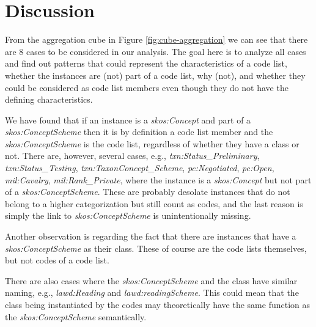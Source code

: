 
\section{Discussion}
\label{s:discussion}
From the aggregation cube in Figure \ref{fig:cube-aggregation} we can see that there are 8 cases to be considered in our analysis. The goal here is to analyze all cases and find out patterns that could represent the characteristics of a code list, whether the instances are (not) part of a code list, why (not), and whether they could be considered as code list members even though they do not have the defining characteristics.

We have found that if an instance is a \textit{skos:Concept} and part of a \textit{skos:ConceptScheme} then it is by definition a code list member and the \textit{skos:ConceptScheme} is the code list, regardless of whether they have a class or not. There are, however, several cases, e.g., \textit{txn:Status\_Preliminary}, \textit{txn:Status\_Testing}, \textit{txn:TaxonConcept\_Scheme}, \textit{pc:Negotiated}, \textit{pc:Open},  \textit{mil:Cavalry},  \textit{mil:Rank\_Private}, where the instance is a \textit{skos:Concept} but not part of a \textit{skos:ConceptScheme}. These are probably desolate instances that do not belong to a higher categorization but still count as codes, and the last reason is simply the link to \textit{skos:ConceptScheme} is unintentionally missing.

Another observation is regarding the fact that there are instances that have a \textit{skos:ConceptScheme} as their class. These of course are the code lists themselves, but not codes of a code list. 

There are also cases where the \textit{skos:ConceptScheme} and the class have similar naming, e.g., \textit{lawd:Reading} and \textit{lawd:readingScheme}. This could mean that the class being instantiated by the codes may theoretically have the same function as the \textit{skos:ConceptScheme} semantically.

